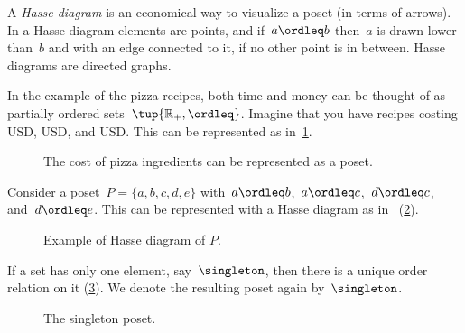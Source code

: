 A \emph{Hasse diagram} is an economical way to visualize a poset (in terms of arrows). In a Hasse diagram elements are points, and if~$a \ordleq b$ then~$a$ is drawn lower than~$b$ and with an edge connected to it, if no other point is in between. Hasse diagrams are directed graphs.

In the example of the pizza recipes, both time and money can be thought of as partially ordered sets~$\tup{\mathbb{R}_+,\ordleq}$. Imagine that you have recipes costing \unit[1]{USD}, \unit[2]{USD}, and \unit[3]{USD}. This can be represented as in~\cref{fig:hassepizza}.

\begin{figure}[h!]
    \begin{center}
    \caption{The cost of pizza ingredients can be represented as a poset.\label{fig:hassepizza}}
    \end{center}
\end{figure}


\begin{example}
Consider a poset~$P=\{a,b,c,d,e\}$ with~$a\ordleq b$,~$a\ordleq c$,~$d\ordleq c$, and~$d\ordleq e$. This can be represented with a Hasse diagram as in ~(\cref{fig:hasse}).
\end{example}

\begin{figure}[h!]
   \centering
   \caption{Example of Hasse diagram of $P$. \label{fig:hasse}}
\end{figure}

\begin{example}
\label{ex:singleton}
If a set has only one element, say~$\singleton$, then there is a unique order relation on it (\cref{fig:singleton}). We denote the resulting poset again by~$\singleton$.
\end{example}
\begin{figure}[h!]
   \centering
   \caption{The singleton poset.\label{fig:singleton}}
\end{figure}

